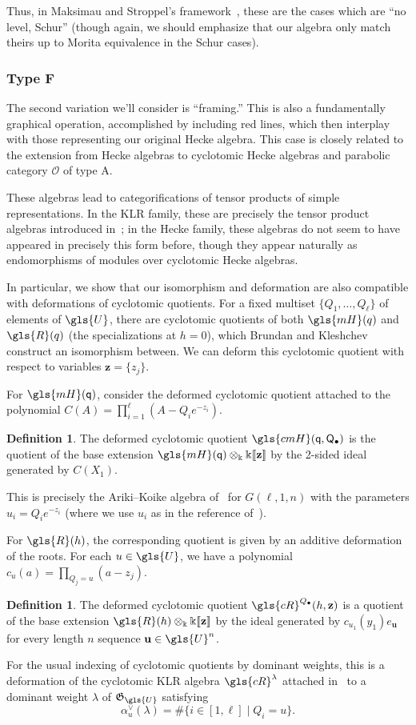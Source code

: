 \documentclass[10pt]{article}
\theoremstyle{definition}
\newtheorem{defi}[theorem]{Definition}
\newcommand{\Bz}{\mathbf{z}}
\newcommand{\pq}{\mathsf{q}}
\newcommand{\K}{\Bbbk}%
\newcommand{\la}{\lambda}
\newcommand{\PQ}{\mathsf{Q}}
\newcommand{\Bu}{\mathbf{u}}
\newcommand{\al}{\alpha}
\newcommand{\cO}{\mathcal{O}}
\newcommand\llbracket{[\![}
\newcommand\rrbracket{]\!]}
\begin{document}
 Thus, in Maksimau and Stroppel's framework~\cite{MS18}, these are the cases which are
 ``no level, Schur'' (though again, we should emphasize that our
 algebra only match theirs up to Morita equivalence in the Schur
 cases). 

\subsubsection*{Type F}
The second variation we'll consider is ``framing.'' This is also a
fundamentally graphical operation, accomplished by including red lines, which
then interplay with those representing our original Hecke algebra.
This case is closely related to the extension from Hecke algebras to
cyclotomic Hecke algebras and parabolic category $\cO$ of type A.

These algebras lead to categorifications of tensor products of simple
representations. 
In the KLR family, these are precisely the tensor
product algebras introduced in~\cite[Def.~4.7]{Webmerged}; in the Hecke family,
these algebras do not seem to have appeared in precisely this form
before, though they appear naturally as endomorphisms of modules
over cyclotomic Hecke algebras.

In particular, we show that our isomorphism and deformation are also compatible with
 deformations of cyclotomic quotients. 
For a fixed multiset $\{Q_1,\dots, Q_\ell\}$ of elements of $\gls{U}$, there are cyclotomic quotients of both
 $\gls{mH}(q)$ and $\gls{R}(q)$ (the specializations at $h=0$), which Brundan and Kleshchev construct an
 isomorphism between. We can deform this cyclotomic quotient with
 respect to variables $\mathbf{z}=\{z_{j}\}$.

For $\gls{mH}(\pq)$, consider the
deformed cyclotomic quotient attached to the 
polynomial 
\mbox{$C(A)= \prod_{i=1}^\ell
(A-Q_ie^{-z_i}).$} 
\begin{defi}\label{def:cmH}
 The deformed cyclotomic quotient $\gls{cmH}(\pq,\PQ_\bullet)$ is the quotient
 of the base extension $\gls{mH}(\pq)\otimes_\K\K\llbracket \mathbf{z}\rrbracket $ by the
 2-sided ideal generated by $C(X_1)$.
\end{defi}
This is precisely the Ariki--Koike algebra of~\cite[Def.~3.1]{AK} for
$G(\ell,1,n)$ with the parameters $u_i=Q_ie^{-z_i}$ (where we use $u_i$ as in the reference
of~\cite{AK}).


For $\gls{R}(h)$, the corresponding quotient is given by an additive
deformation of the roots. For each $u\in \gls{U}$, we have a
polynomial $c_u(a)=\prod_{Q_j=u}(a-z_{j})$.
\begin{defi}\label{def:cR}
 The deformed cyclotomic quotient $\gls{cR}^{Q_\bullet}(h,\Bz)$ is a quotient of
 the base extension $\gls{R}(h)\otimes_\K\K\llbracket \mathbf{z}\rrbracket $ by the ideal
 generated by $c_{u_1}(y_1)e_\Bu$ for every length $n$ sequence
 $\Bu\in \gls{U}^n$.
\end{defi}
For the usual indexing of cyclotomic quotients by dominant weights,
this is a deformation of the cyclotomic KLR algebra $\gls{cR}^\la$ attached in~\cite{KLI} to a
dominant weight $\la$ of $\mathfrak{G}_{\gls{U}}$ satisfying
\[\al_u^\vee(\la)=\#\{i\in [1,\ell]\mid Q_i=u\}.\]
\end{document}
